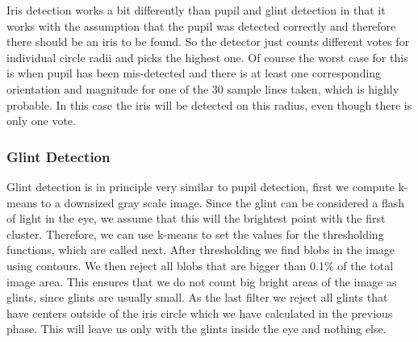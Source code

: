Iris detection works a bit differently than pupil and glint detection in that it works with the assumption that the pupil was detected correctly and therefore there should be an iris to be found. So the detector just counts different votes for individual circle radii and picks the highest one. Of course the worst case for this is when pupil has been mis-detected and there is at least one corresponding orientation and magnitude for one of the 30 sample lines taken, which is highly probable. In this case the iris will be detected on this radius, even though there is only one vote.


\subsubsection{Glint Detection}

Glint detection is in principle very similar to pupil detection, first we compute k-means to a downsized gray scale image. Since the glint can be considered a flash of light in the eye, we assume that this will the brightest point with the first cluster. 
Therefore, we can use k-means to set the values for the thresholding functions, which are called next. After thresholding we find blobs in the image using contours. We then reject all blobs that are bigger than 0.1\% of the total image area. This ensures that we do not count big bright areas of the image as glints, since glints are usually small. As the last filter we reject all glints that have centers outside of the iris circle which we have calculated in the previous phase. This will leave us only with the glints inside the eye and nothing else.

